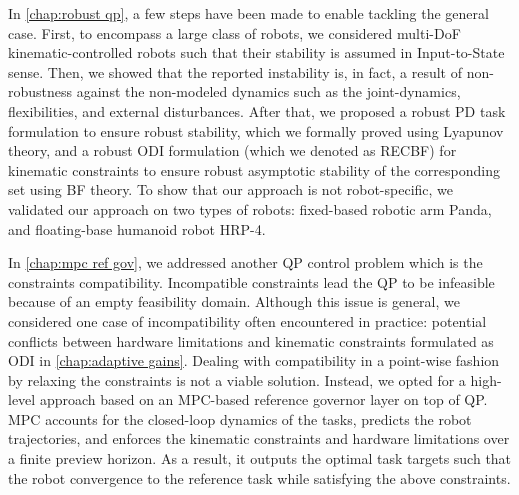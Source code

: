 In \cref{chap:robust qp}, a few steps have been made to enable tackling the general case. First, to encompass a large class of robots, we considered multi-DoF kinematic-controlled robots such that their stability is assumed in Input-to-State sense. Then, we showed that the reported instability is, in fact, a result of non-robustness against the non-modeled dynamics such as the joint-dynamics, flexibilities, and external disturbances. After that, we proposed a robust PD task formulation to ensure robust stability, which we formally proved using Lyapunov theory, and a robust ODI formulation (which we denoted as RECBF) for kinematic constraints to ensure robust asymptotic stability of the corresponding set using BF theory. To show that our approach is not robot-specific, we validated our approach on two types of robots: fixed-based robotic arm Panda, and floating-base humanoid robot HRP-4.    

In \cref{chap:mpc ref gov}, we addressed another QP control problem which is the constraints compatibility. Incompatible constraints lead the QP to be infeasible because of an empty feasibility domain. Although this issue is general, we considered one case of incompatibility often encountered in practice: potential conflicts between hardware limitations and kinematic constraints formulated as ODI in \cref{chap:adaptive gains}. Dealing with compatibility in a point-wise fashion by relaxing the constraints is not a viable solution. Instead, we opted for a high-level approach based on an MPC-based reference governor layer on top of QP. MPC accounts for the closed-loop dynamics of the tasks, predicts the robot trajectories, and enforces the kinematic constraints and hardware limitations over a finite preview horizon. As a result, it outputs the optimal task targets such that the robot convergence to the reference task while satisfying the above constraints. 

